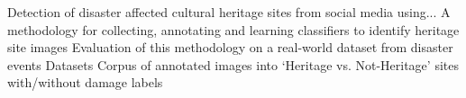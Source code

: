 \usepackage{items}
\begin{itemize}
    \1 Detection of disaster affected cultural heritage sites from social media using...
        \2 A methodology for collecting, annotating and learning classifiers to identify heritage site images
        \2 Evaluation of this methodology on a real-world dataset from disaster events
        \2 Datasets
            \3 Corpus of annotated images into `Heritage vs. Not-Heritage' sites with/without damage labels
\end{itemize}
